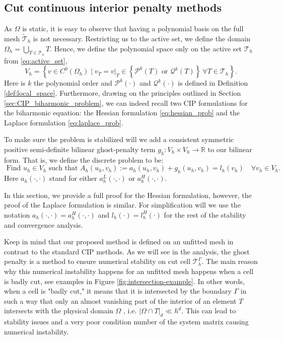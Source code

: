 \documentclass[11pt]{article}
\theoremstyle{remark}
\newcommand{\abs}[1]{\left\lvert #1 \right\rvert}
\numberwithin{equation}{section}
\begin{document}
\subsection{Cut continuous interior penalty methods }%
\label{sub:cut_cip_method}

As $\Omega $ is static, it is easy to observe that having a polynomial basis on the full mesh $\widetilde{\mathcal{T}}_{h}$ is not necessary. Restricting us to the active set, we define the domain $\Omega _{h} = \bigcup _{T \in \mathcal{T} _{h}} T$.
Hence, we define the polynomial space only on the active set $\mathcal{T}_{h} $ from \eqref{eq:active_set},
\begin{equation}
    \label{eq:vh_energy}
V_{h} = \left\{ v \in C^{0}( \Omega _{h}  )  \mid  v_{T} = v | _{T} \in \left\{ \mathcal{P} ^{k} ( T ) \text{ or } \mathcal{Q} ^{k}( T ) \right\}  \  \forall T \in
\mathcal{T}_{h}    \right\}.
\end{equation}
Here is $k$ the polynomial order and $\mathcal{P}^{k}( \cdot  )  $ and $\mathcal{Q} ^{k}( \cdot ) $ is defined in Definition \ref{def:local_space}.
Furthermore, drawing on the principles outlined in Section \ref{sec:CIP_biharmonic_problem}, we can indeed recall two CIP formulations for the biharmonic equation: the Hessian formulation \eqref{eq:hessian_prob} and the Laplace formulation \eqref{eq:laplace_prob}.

To make sure the problem is stabilized will we add a consistent symmetric positive semi-definite bilinear ghost-penalty term  $g_{h}: V_{h} \times  V_{h} \to \mathbb{R} $ to our bilinear form. That is, we define the discrete problem to be:
\begin{equation}
\label{eq:discrete_CutCIP_prob}
\text{ Find } u_{h} \in V_{h}  \text{ such that }    A_{h}( u_{h} ,v_{h} ) := a_{h}( u_{h}, v_{h})  + g_{h}( u_{h},v_{h}) = l_{h} ( v_{h}) \quad  \forall v_{h} \in  V_{h}.
\end{equation}
Here $a_{h}( \cdot,\cdot  ) $ stand for either $a_{h}^{L}( \cdot ,\cdot ) $ or $a_{h}^{H}( \cdot ,\cdot ) $.

In this section, we provide a full proof for the Hessian formulation, however, the proof of the Laplace formulation is similar. For simplification will we use the notation $a_{h}(\cdot ,\cdot  ) = a_{h}^{H}(\cdot  ,\cdot )$ and
$l_{h}(\cdot ) =l_{h}^{H}(\cdot )$ for the rest of the stability and convergence analysis.

Keep in mind that our proposed method is defined on an unfitted mesh in contrast to the standard CIP methods. As we will see in the analysis, the ghost penalty is a method to ensure numerical stability on cut cell $\mathcal{T} ^{\Gamma }_{h}$. The main reason why
this numerical instability happens for an unfitted mesh happens when a cell is badly cut, see examples in Figure \ref{fig:intersection-example}.
In other words, when a cell is "badly cut," it means that it is intersected by the boundary $\Gamma$ in such a way that only an almost vanishing part of the interior of an element $T$  intersects with the physical domain $\Omega $ , i.e. $\abs{ \Omega \cap
T }_{d} \ll h^{d}$. This can lead to stability issues and a very poor condition number of the system matrix causing numerical instability.
\end{document}
